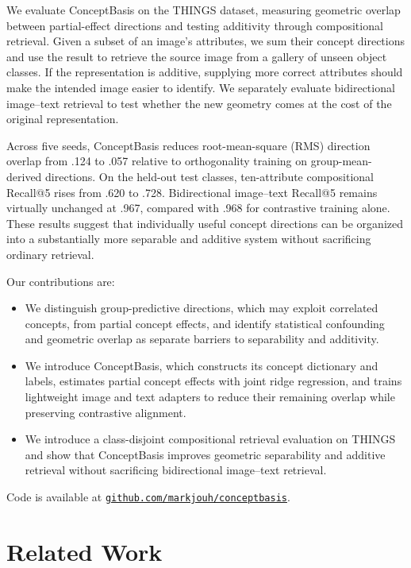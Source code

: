 \documentclass[mlmain,onecolumn]{jmlr}
\begin{document}
We evaluate ConceptBasis on the THINGS dataset, measuring geometric overlap between partial-effect directions and testing additivity through compositional retrieval. Given a subset of an image's attributes, we sum their concept directions and use the result to retrieve the source image from a gallery of unseen object classes. If the representation is additive, supplying more correct attributes should make the intended image easier to identify. We separately evaluate bidirectional image--text retrieval to test whether the new geometry comes at the cost of the original representation.

Across five seeds, ConceptBasis reduces root-mean-square (RMS) direction overlap from .124 to .057 relative to orthogonality training on group-mean-derived directions. On the held-out test classes, ten-attribute compositional Recall@5 rises from .620 to .728. Bidirectional image--text Recall@5 remains virtually unchanged at .967, compared with .968 for contrastive training alone. These results suggest that individually useful concept directions can be organized into a substantially more separable and additive system without sacrificing ordinary retrieval.

Our contributions are:
\begin{itemize}
  \item We distinguish group-predictive directions, which may exploit correlated concepts, from partial concept effects, and identify statistical confounding and geometric overlap as separate barriers to separability and additivity.
  \item We introduce ConceptBasis, which constructs its concept dictionary and labels, estimates partial concept effects with joint ridge regression, and trains lightweight image and text adapters to reduce their remaining overlap while preserving contrastive alignment.
  \item We introduce a class-disjoint compositional retrieval evaluation on THINGS and show that ConceptBasis improves geometric separability and additive retrieval without sacrificing bidirectional image--text retrieval.
\end{itemize}
Code is available at \href{https://github.com/markjouh/conceptbasis/tree/786074beed8c5d23681731fbddeecc54195f0188}{\texttt{github.com/markjouh/conceptbasis}}.

\section{Related Work}
\end{document}
